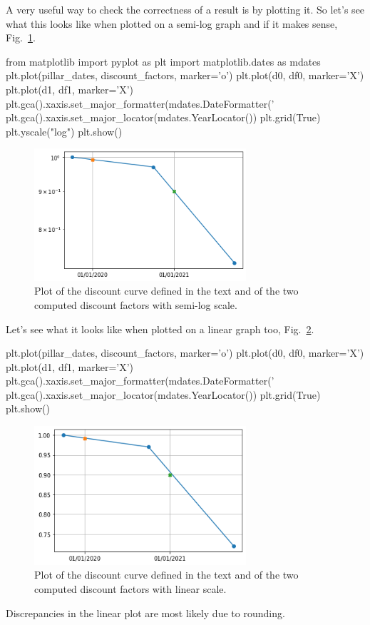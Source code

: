 A very useful way to check the correctness of a result is by plotting it. So let's see what this looks like when plotted on a semi-log graph and if it makes sense, Fig.~\ref{fig:log_discount_curve}.

\begin{ipython}
from matplotlib import pyplot as plt
import matplotlib.dates as mdates
plt.plot(pillar_dates, discount_factors, marker='o')
plt.plot(d0, df0, marker='X')
plt.plot(d1, df1, marker='X')
plt.gca().xaxis.set_major_formatter(mdates.DateFormatter('%
plt.gca().xaxis.set_major_locator(mdates.YearLocator())
plt.grid(True)
plt.yscale("log")
plt.show()
\end{ipython}

\begin{figure}[htb]
	\centering
	\includegraphics[width=0.7\textwidth]{figures/log_discount_curve}
	\caption{Plot of the discount curve defined in the text and of the two computed
		discount factors with semi-log scale.}
	\label{fig:log_discount_curve}
\end{figure}
\noindent
Let's see what it looks like when plotted on a linear graph too, Fig.~\ref{fig:linear_discount_curve}.
\begin{ipython}
plt.plot(pillar_dates, discount_factors, marker='o')
plt.plot(d0, df0, marker='X')
plt.plot(d1, df1, marker='X')
plt.gca().xaxis.set_major_formatter(mdates.DateFormatter('%
plt.gca().xaxis.set_major_locator(mdates.YearLocator())
plt.grid(True)
plt.show()
\end{ipython}

\begin{figure}[htb]
	\centering
	\includegraphics[width=0.7\textwidth]{figures/linear_discount_curve}
	\caption{Plot of the discount curve defined in the text and of the two computed
		discount factors with linear scale.}
	\label{fig:linear_discount_curve}
\end{figure}
\noindent
Discrepancies in the linear plot are most likely due to rounding.

